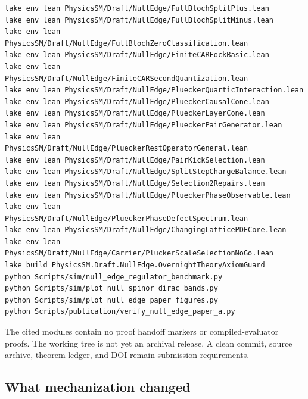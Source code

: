 \documentclass[11pt]{article}
\begin{document}
\begin{verbatim}
lake env lean PhysicsSM/Draft/NullEdge/FullBlochSplitPlus.lean
lake env lean PhysicsSM/Draft/NullEdge/FullBlochSplitMinus.lean
lake env lean PhysicsSM/Draft/NullEdge/FullBlochZeroClassification.lean
lake env lean PhysicsSM/Draft/NullEdge/FiniteCARFockBasic.lean
lake env lean PhysicsSM/Draft/NullEdge/FiniteCARSecondQuantization.lean
lake env lean PhysicsSM/Draft/NullEdge/PlueckerQuarticInteraction.lean
lake env lean PhysicsSM/Draft/NullEdge/PlueckerCausalCone.lean
lake env lean PhysicsSM/Draft/NullEdge/PlueckerLayerCone.lean
lake env lean PhysicsSM/Draft/NullEdge/PlueckerPairGenerator.lean
lake env lean PhysicsSM/Draft/NullEdge/PlueckerRestOperatorGeneral.lean
lake env lean PhysicsSM/Draft/NullEdge/PairKickSelection.lean
lake env lean PhysicsSM/Draft/NullEdge/SplitStepChargeBalance.lean
lake env lean PhysicsSM/Draft/NullEdge/Selection2Repairs.lean
lake env lean PhysicsSM/Draft/NullEdge/PlueckerPhaseObservable.lean
lake env lean PhysicsSM/Draft/NullEdge/PlueckerPhaseDefectSpectrum.lean
lake env lean PhysicsSM/Draft/NullEdge/ChangingLatticePDECore.lean
lake env lean PhysicsSM/Draft/NullEdge/Carrier/PluckerScaleSelectionNoGo.lean
lake build PhysicsSM.Draft.NullEdge.OvernightTheoryAxiomGuard
python Scripts/sim/null_edge_regulator_benchmark.py
python Scripts/sim/plot_null_spinor_dirac_bands.py
python Scripts/sim/plot_null_edge_paper_figures.py
python Scripts/publication/verify_null_edge_paper_a.py
\end{verbatim}
The cited modules contain no proof handoff markers or compiled-evaluator proofs.
The working tree is not yet an archival release.  A clean commit, source
archive, theorem ledger, and DOI remain submission requirements.

\subsection*{What mechanization changed}
\end{document}
